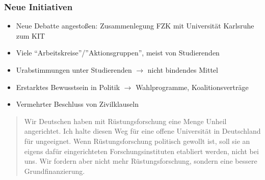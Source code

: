 \documentclass[presentation]{beamer}
\begin{document}
\begin{frame}
\frametitle{Neue Initiativen}
\label{sec-1-4}

\begin{itemize}
\item Neue Debatte angestoßen: Zusammenlegung FZK mit Universität Karlsruhe zum KIT
\item Viele ``Arbeitskreise''/''Aktionsgruppen'', meist von Studierenden
\item Urabstimmungen unter Studierenden \(\rightarrow\) nicht bindendes Mittel
\item Erstarktes Bewusstsein in Politik \(\rightarrow\) Wahlprogramme, Koalitionsverträge
\item Vermehrter Beschluss von Zivilklauseln
\end{itemize}
\begin{quote} %
\label{sec-1-4-1}

\fontsize{6pt}{7.2}\selectfont
Wir Deutschen haben mit Rüstungsforschung eine Menge Unheil angerichtet. Ich halte diesen Weg für eine offene Universität in Deutschland für ungeeignet. Wenn Rüstungsforschung politisch gewollt ist, soll sie an eigens dafür eingerichteten Forschungsinstituten etabliert werden, nicht bei uns. Wir fordern aber nicht mehr Rüstungsforschung, sondern eine bessere Grundfinanzierung.
\vskip1mm \hspace*{}
\end{quote}
\end{frame}
\end{document}
